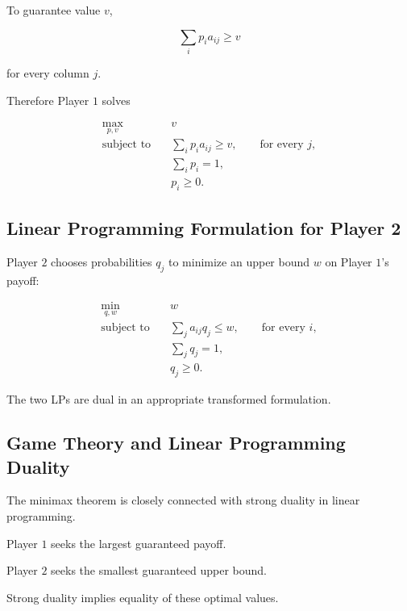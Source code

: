 To guarantee value \(v\),

\[
\boxed{
\sum_i
p_i a_{ij}
\geq
v
}
\]

for every column \(j\).

Therefore Player \(1\) solves

\[
\boxed{
\begin{aligned}
\max_{p,v}
\quad&
v
\\
\text{subject to}
\quad&
\sum_i
p_i a_{ij}
\geq
v,
\qquad
\text{for every }j,
\\
&
\sum_i
p_i=1,
\\
&
p_i\geq0.
\end{aligned}
}
\]

\subsection{Linear Programming Formulation for Player 2}
\label{subsec:zero-sum-player-two-lp}

Player \(2\) chooses probabilities \(q_j\) to minimize an upper bound \(w\)
on Player \(1\)'s payoff:

\[
\boxed{
\begin{aligned}
\min_{q,w}
\quad&
w
\\
\text{subject to}
\quad&
\sum_j
a_{ij}q_j
\leq
w,
\qquad
\text{for every }i,
\\
&
\sum_j
q_j=1,
\\
&
q_j\geq0.
\end{aligned}
}
\]

The two LPs are dual in an appropriate transformed formulation.

\subsection{Game Theory and Linear Programming Duality}
\label{subsec:game-theory-lp-duality}

The minimax theorem is closely connected with strong duality in linear
programming.

Player \(1\) seeks the largest guaranteed payoff.

Player \(2\) seeks the smallest guaranteed upper bound.

Strong duality implies equality of these optimal values.

